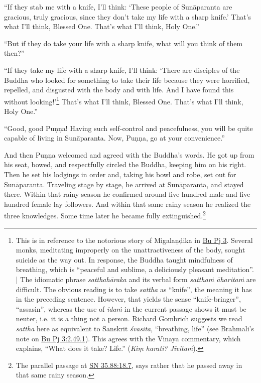 \documentclass[12pt,openany]{book}%
\begin{document}
“If they stab me with a knife, I’ll think: ‘These people of \textsanskrit{Sunāparanta} are gracious, truly gracious, since they don’t take my life with a sharp knife.’ That’s what I’ll think, Blessed One. That’s what I’ll think, Holy One.” 

“But if they do take your life with a sharp knife, what will you think of them then?” 

“If they take my life with a sharp knife, I’ll think: ‘There are disciples of the Buddha who looked for something to take their life because they were horrified, repelled, and disgusted with the body and with life. And I have found this without looking!’\footnote{This is in reference to the notorious story of \textsanskrit{Migalaṇḍika} in \href{https://suttacentral.net/pli-tv-bu-vb-pj3/en/sujato}{Bu Pj 3}. Several monks, meditating improperly on the unattractiveness of the body, sought suicide as the way out. In response, the Buddha taught mindfulness of breathing, which is “peaceful and sublime, a deliciously pleasant meditation”. | The idiomatic phrase \textit{\textsanskrit{satthahāraka}} and its verbal form \textit{\textsanskrit{satthaṁ} \textsanskrit{āharitaṁ}} are difficult. The obvious reading is to take \textit{sattha} as “knife”, the meaning it has in the preceding sentence. However, that yields the sense “knife-bringer”, “assasin”, whereas the use of \textit{\textsanskrit{idaṁ}} in the current passage shows it must be neuter, i.e. it is a thing not a person. Richard Gombrich suggests we read \textit{sattha} here as equivalent to Sanskrit \textit{\textsanskrit{śvasita}}, “breathing, life” (see Brahmali’s note on \href{https://suttacentral.net/pli-tv-bu-vb-pj3/en/sujato\#2.49.1}{Bu Pj 3:2.49.1}). This agrees with the Vinaya commentary, which explains, “What does it take? Life.” (\textit{Kiṃ harati? \textsanskrit{Jīvitaṁ}}). } That’s what I’ll think, Blessed One. That’s what I’ll think, Holy One.” 

“Good, good \textsanskrit{Puṇṇa}! Having such self-control and peacefulness, you will be quite capable of living in \textsanskrit{Sunāparanta}. Now, \textsanskrit{Puṇṇa}, go at your convenience.” 

And then \textsanskrit{Puṇṇa} welcomed and agreed with the Buddha’s words. He got up from his seat, bowed, and respectfully circled the Buddha, keeping him on his right. Then he set his lodgings in order and, taking his bowl and robe, set out for \textsanskrit{Sunāparanta}. Traveling stage by stage, he arrived at \textsanskrit{Sunāparanta}, and stayed there. Within that rainy season he confirmed around five hundred male and five hundred female lay followers. And within that same rainy season he realized the three knowledges. Some time later he became fully extinguished.\footnote{The parallel passage at \href{https://suttacentral.net/sn35.88/en/sujato\#18.7}{SN 35.88:18.7}, says rather that he passed away in that same rainy season. } 
\end{document}
